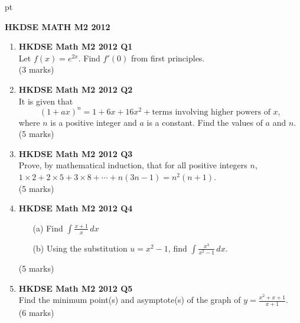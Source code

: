 \documentclass[12pt]{article}
\begin{document}
 pt
\begin{center}
	{\large \bf HKDSE MATH M2 2012}\\
	\vspace{2 mm}

\end{center}
\vspace{0.05cm}

\begin{enumerate}
	\item \textbf{HKDSE Math M2 2012 Q1}\\
	Let $f(x) = e^{2x}$. Find $f'(0)$ from first principles. \\(3 marks)


	\item \textbf{HKDSE Math M2 2012 Q2}\\
	It is given that 
	$$(1+ax)^n = 1 + 6x + 16x^2 +\text{terms involving higher powers of }x,$$
	where $n$ is a positive integer and $a$ is a constant. Find the values of $a$ and $n$.\\(5 marks)


	\item \textbf{HKDSE Math M2 2012 Q3}\\
	Prove, by mathematical induction, that for all positive integers $n$,\\
		$\displaystyle 1 \times 2 + 2 \times 5 + 3 \times 8 + \cdots + n(3n-1) = n^2(n+1)$. \\(5 marks)
		

	\item \textbf{HKDSE Math M2 2012 Q4}
	\begin{enumerate}
		\item [(a)]Find $\displaystyle\int \frac{x+1}{x}\,dx$
		\item [(b)]Using the substitution $u = x^2-1$, find $\displaystyle\int\frac{x^3}{x^2 - 1}\,dx$.
	\end{enumerate}
	(5 marks)

	\item \textbf{HKDSE Math M2 2012 Q5}\\
	Find the minimum point(s) and asymptote(s) of the graph of $\displaystyle y = \frac{x^2+x+1}{x+1}$. \\(6 marks)


\end{enumerate}
\end{document}
